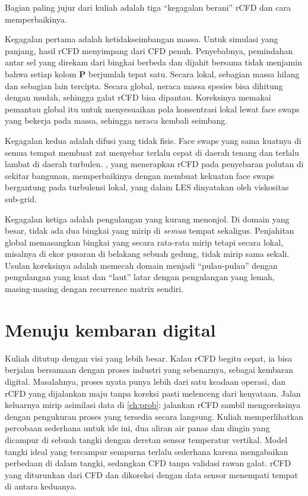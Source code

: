 Bagian paling jujur dari kuliah adalah tiga ``kegagalan berani'' rCFD dan cara memperbaikinya.

Kegagalan pertama adalah ketidakseimbangan massa. Untuk simulasi yang panjang, hasil rCFD menyimpang
dari CFD penuh. Penyebabnya, pemindahan antar sel yang direkam dari bingkai berbeda dan dijahit bersama
tidak menjamin bahwa setiap kolom $\bm P$ berjumlah tepat satu. Secara lokal, sebagian massa hilang dan
sebagian lain tercipta. Secara global, neraca massa spesies bisa dihitung dengan mudah, sehingga galat
rCFD bisa dipantau. Koreksinya memakai pemantau global itu untuk menyesuaikan pola konsentrasi lokal
lewat face swaps yang bekerja pada massa, sehingga neraca kembali seimbang.

Kegagalan kedua adalah difusi yang tidak fisis. Face swaps yang sama kuatnya di semua tempat membuat zat
menyebar terlalu cepat di daerah tenang dan terlalu lambat di daerah turbulen. \citet{du2020}, yang
menerapkan rCFD pada penyebaran polutan di sekitar bangunan, memperbaikinya dengan membuat kekuatan face
swaps bergantung pada turbulensi lokal, yang dalam LES dinyatakan oleh viskositas sub-grid.

Kegagalan ketiga adalah pengulangan yang kurang menonjol. Di domain yang besar, tidak ada dua bingkai
yang mirip di \emph{semua} tempat sekaligus. Penjahitan global memasangkan bingkai yang secara rata-rata
mirip tetapi secara lokal, misalnya di ekor pusaran di belakang sebuah gedung, tidak mirip sama sekali.
Usulan koreksinya adalah memecah domain menjadi ``pulau-pulau'' dengan pengulangan yang kuat dan ``laut''
latar dengan pengulangan yang lemah, masing-masing dengan recurrence matrix sendiri.

\section{Menuju kembaran digital}

Kuliah ditutup dengan visi yang lebih besar. Kalau rCFD begitu cepat, ia bisa berjalan bersamaan dengan
proses industri yang sebenarnya, sebagai kembaran digital. Masalahnya, proses nyata punya lebih dari satu
keadaan operasi, dan rCFD yang dijalankan maju tanpa koreksi pasti melenceng dari kenyataan. Jalan
keluarnya mirip asimilasi data di \cref{ch:prob}: jalankan rCFD sambil mengoreksinya dengan pengukuran
proses yang tersedia secara langsung. Kuliah memperlihatkan percobaan sederhana untuk ide ini, dua aliran
air panas dan dingin yang dicampur di sebuah tangki dengan deretan sensor temperatur vertikal. Model
tangki ideal yang tercampur sempurna terlalu sederhana karena mengabaikan perbedaan di dalam tangki,
sedangkan CFD tanpa validasi rawan galat. rCFD yang diturunkan dari CFD dan dikoreksi dengan data sensor
menempati tempat di antara keduanya.

